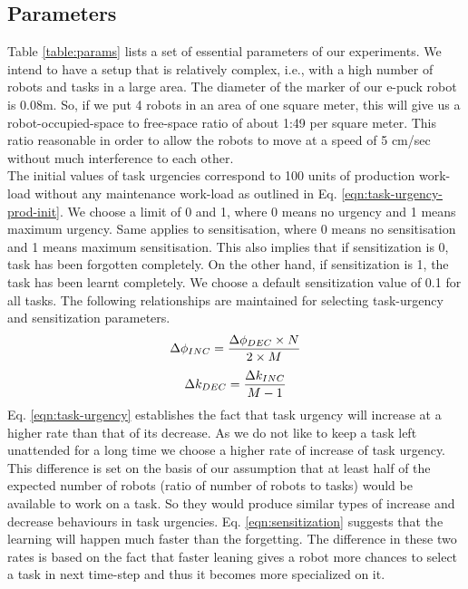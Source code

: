 \subsection{Parameters}
Table \ref{table:params} lists a set of essential parameters of our experiments. We intend to have a setup that is relatively complex, i.e., with a high number of robots and tasks in a large area. The diameter of the marker of our e-puck robot is 0.08m. So, if we put 4 robots in an area of one square meter, this will give us a robot-occupied-space to free-space ratio of about 1:49 per square meter. This ratio reasonable in order to allow the robots to move at a speed of 5 cm/sec without much interference to each other. \\
The initial values of task urgencies correspond to 100 units of production work-load without any maintenance work-load as outlined in Eq. \ref{eqn:task-urgency-prod-init}. We choose a limit of 0 and 1, where 0 means no urgency and 1 means maximum urgency. Same applies to sensitisation, where 0 means no sensitisation and 1 means maximum sensitisation. This also implies that if sensitization is 0, task has been forgotten completely. On the other hand, if sensitization is 1, the task has been learnt completely. We choose a default sensitization value of 0.1 
for all tasks. The following relationships are maintained for selecting task-urgency and sensitization parameters.
\begin{equation}
\small
\Delta\phi_{INC} = \frac{\Delta\phi_{DEC} \times N}{2 \times M}
\label{eqn:task-urgency}
\end{equation}
%
\begin{equation}
\small
\Delta k_{DEC} = \frac{\Delta k_{INC}} {M - 1} 
\label{eqn:sensitization}
\end{equation}
%
Eq. \ref{eqn:task-urgency} establishes the fact that task urgency will increase at a higher rate than that of its decrease. As we do not like to keep a task left unattended for a long time we choose a higher rate of increase of task urgency. This difference is set on the basis of our assumption that at least half of the expected number of robots (ratio of number of robots to tasks) would be available to work on a task. So they would produce similar types of increase and decrease behaviours in task urgencies.
Eq. \ref{eqn:sensitization} suggests that the learning will happen much faster than the forgetting. The difference in these two rates is based on the fact that faster leaning gives a robot more chances to select a task in next time-step and thus it becomes more specialized on it. %
